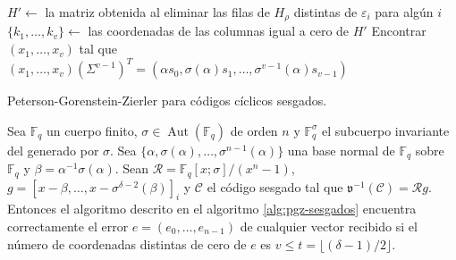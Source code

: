 \begin{Ualgorithm}[htbp]
{    \(H' \longleftarrow\) la matriz obtenida al eliminar las filas de \(H_{\rho}\) distintas de \(\varepsilon_i\) para algún \(i\)\;\label{algl:pgz-sesgados-h-prima}
    \(\{k_1, \dots, k_v\} \longleftarrow\) las coordenadas de las columnas igual a cero de \(H'\)\;
  }
  Encontrar \((x_1, \dots, x_v)\) tal que \((x_1, \dots, x_v)(\Sigma^{v-1})^T = (\alpha s_0, \sigma(\alpha)s_1, \dots, \sigma^{v-1}(\alpha)s_{v-1})\)\;\label{algl:pgz-sesgados-solucion-sistema}
  \label{algl:pgz-sesgados-error}
  \caption{Peterson-Gorenstein-Zierler para códigos cíclicos sesgados.}
  \label{alg:pgz-sesgados}
\end{Ualgorithm}

\begin{theorem}
  Sea \(\mathbb F_q\) un cuerpo finito, \(\sigma \in \operatorname{Aut}(\mathbb F_q)\) de orden \(n\) y \(\mathbb F_q^{\sigma}\) el subcuerpo invariante del generado por \(\sigma\).
  Sea \(\{\alpha, \sigma(\alpha), \dots, \sigma^{n-1}(\alpha)\}\) una base normal de \(\mathbb F_q\) sobre \(\mathbb F_{q}\) y \(\beta = \alpha^{-1}\sigma(\alpha)\).
  Sean \(\mathcal R = \mathbb F_q[x; \sigma]/(x^n - 1)\), \(g = \left[x - \beta, \dots, x - \sigma^{\delta - 2}(\beta)\right]_{i}\) y \(\mathcal C\) el código  sesgado tal que \(\mathfrak v^{-1}(\mathcal C) = \mathcal Rg\).
  Entonces el algoritmo descrito en el algoritmo \ref{alg:pgz-sesgados} encuentra correctamente el error \(e = (e_0, \dots, e_{n-1})\) de cualquier vector recibido si el número de coordenadas distintas de cero de \(e\) es \(v \leq t = \lfloor (\delta - 1)/2 \rfloor\).
\end{theorem}

